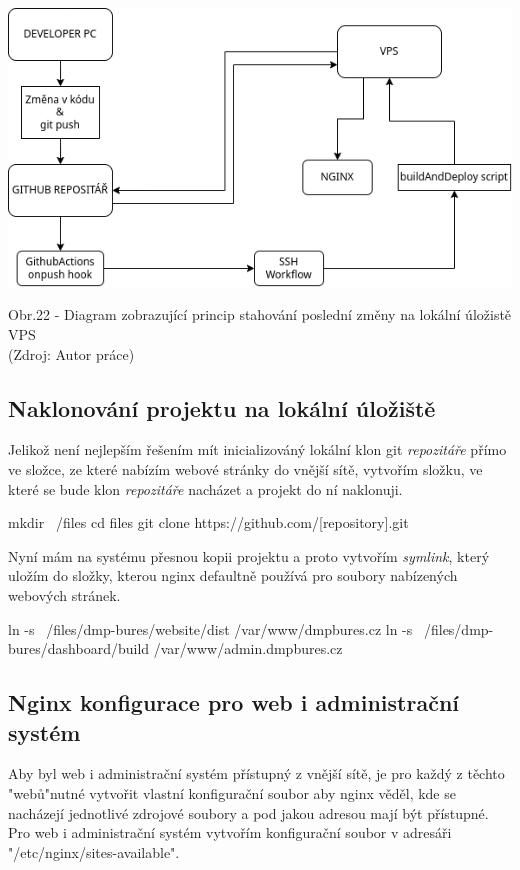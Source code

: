 \documentclass[12pt,a4paper]{report}
\begin{document}
  \vspace*{0.5cm}
  \noindent\includegraphics[width=\linewidth]{CIDC_visualization.png}
  \begin{center}
    Obr.22 - Diagram zobrazující princip stahování poslední změny na lokální úložistě VPS \\
    (Zdroj: Autor práce)
  \end{center}
  \vspace*{0.5cm}

  \subsection{Naklonování projektu na lokální úložiště}
  Jelikož není nejlepším řešením mít inicializováný lokální klon git \emph{repozitáře} přímo ve složce, ze které 
  nabízím webové stránky do vnější sítě, vytvořím složku, ve které se bude klon \emph{repozitáře} nacházet a projekt do ní naklonuji.
  \begin{bash}
    mkdir ~/files
    cd files
    git clone https://github.com/[repository].git 
  \end{bash}
  
  Nyní mám na systému přesnou kopii projektu a proto vytvořím \emph{symlink}, který uložím do složky,
  kterou nginx defaultně používá pro soubory nabízených webových stránek.

  \begin{bash}
    ln -s ~/files/dmp-bures/website/dist /var/www/dmpbures.cz
    ln -s ~/files/dmp-bures/dashboard/build /var/www/admin.dmpbures.cz
  \end{bash}

  \subsection{Nginx konfigurace pro web i administrační systém}
  Aby byl web i administrační systém přístupný z vnější sítě, je pro každý z těchto "webů"\space nutné  vytvořit 
  vlastní konfigurační soubor aby nginx věděl, kde se nacházejí jednotlivé zdrojové soubory a 
  pod jakou adresou mají být přístupné.
  Pro web i administrační systém vytvořím konfigurační soubor v adresáři "/etc/nginx/sites-available".
  
\end{document}
